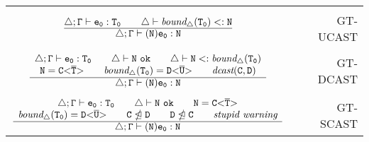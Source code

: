 {\begin{minipage}{\textwidth}
\begin{small}
\begin{tabularx}{\textwidth}{c X r}
& \\

$\frac{\displaystyle \mathtt{\triangle; \Gamma \vdash e_0 : T_0 \quad \quad \triangle \vdash \textit{bound}_\triangle(T_0) <: N}}{\displaystyle \mathtt{\triangle; \Gamma \vdash (N) e_0 : N}}
$ & & GT-UCAST \\

& \\

$ \frac{\displaystyle \begin{array}{c}
  \mathtt{\triangle; \Gamma \vdash e_0 : T_0 \quad \quad \triangle \vdash N\ \texttt{ok} \quad \quad \triangle \vdash N <: \textit{bound}_\triangle(T_0) } \\
  \mathtt{N = \mathtt{C {\tt <} \overline{\tt T} {\tt >} } \quad \quad \textit{bound}_\triangle(T_0) = \mathtt{D {\tt <} \overline{\tt U} {\tt >} }  \quad \quad \textit{dcast}(C,D)}
\end{array}
}{\displaystyle \mathtt{\triangle; \Gamma \vdash (N) e_0 : N}}$ & & GT-DCAST \\

& \\

$\frac{\displaystyle \begin{array}{c}
  \mathtt{\triangle; \Gamma \vdash e_0 : T_0 \quad \quad \triangle \vdash N\ \texttt{ok} \quad \quad N = \mathtt{C {\tt <} \overline{\tt T} {\tt >} }  } \\
  \mathtt{\textit{bound}_\triangle(T_0) = \mathtt{D {\tt <} \overline{\tt U} {\tt >} } \quad \quad C \ntrianglelefteq D \quad \quad D \ntrianglelefteq C \quad \quad \textit{stupid warning}}
\end{array}}{\displaystyle \mathtt{\triangle; \Gamma \vdash (N) e_0 : N}}
$ & & GT-SCAST 
\end{tabularx}
\end{small}
\end{minipage}
}



